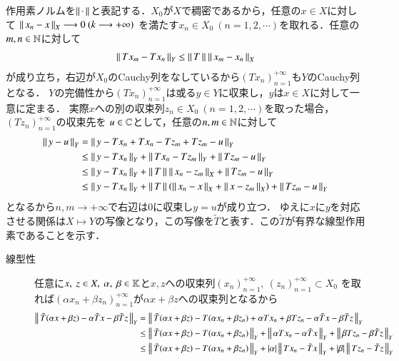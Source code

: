 \begin{prf}
		作用素ノルムを$\left\|\, \cdot\, \right\|_{}$と表記する．$X_0$が$X$で稠密であるから，任意の$x \in X$に対して
		$\left\|\, x_n - x\, \right\|_{X} \longrightarrow 0\ (k \longrightarrow +\infty)$
		を満たす$x_n \in X_0 \ (n=1,2,\cdots)$を取れる．任意の$m,n \in \mathbb{N}$に対して
		\begin{align}
			\left\|\, Tx_m - Tx_n\, \right\|_{Y} \leq \left\|\, T\, \right\|_{} \left\|\, x_m - x_n\, \right\|_{X}
		\end{align}
		が成り立ち，右辺が$X_0$のCauchy列をなしているから$(Tx_n)_{n=1}^{+\infty}$も$Y$のCauchy列となる．
		$Y$の完備性から$(Tx_n)_{n=1}^{+\infty}$は或る$y \in Y$に収束し，$y$は$x \in X$に対して一意に定まる．
		実際$x$への別の収束列$z_n \in X_0 \ (n=1,2,\cdots)$を取った場合，$(Tz_n)_{n=1}^{+\infty}$の収束先を
		$u \in \mathbb{C}$として，任意の$n,m \in \mathbb{N}$に対して
		\begin{align}
			\left\|\, y - u\, \right\|_{Y} &= \left\|\, y - Tx_n + Tx_n - Tz_m + Tz_m - u\, \right\|_{Y} \\
			&\leq \left\|\, y - Tx_n\, \right\|_{Y} + \left\|\, Tx_n - Tz_m\, \right\|_{Y} + \left\|\, Tz_m - u\, \right\|_{Y} \\
			&\leq \left\|\, y - Tx_n\, \right\|_{Y} + \left\|\, T\, \right\|_{}\left\|\, x_n - z_m\, \right\|_{X} + \left\|\, Tz_m - u\, \right\|_{Y} \\
			&\leq \left\|\, y - Tx_n\, \right\|_{Y} + \left\|\, T\, \right\|_{}\left(\left\|\, x_n - x\, \right\|_{X} + \left\|\, x - z_m\, \right\|_{X}\right)+ \left\|\, Tz_m - u\, \right\|_{Y}
		\end{align}
		となるから$n,m \longrightarrow +\infty$で右辺は0に収束し$y = u$が成り立つ．
		ゆえに$x$に$y$を対応させる関係は$X \longmapsto Y$の写像となり，この写像を$\tilde{T}$と表す．この$\tilde{T}$が有界な線型作用素であることを示す．
		\begin{description}
			\item[線型性]
				任意に$x,\ z \in X,\ \alpha,\ \beta \in \mathbb{K}$と$x,z$への収束列$(x_n)_{n=1}^{+\infty},\ (z_n)_{n=1}^{+\infty} \subset X_0$
				を取れば$(\alpha x_n + \beta z_n)_{n=1}^{+\infty}$が$\alpha x+ \beta z$への収束列となるから
				\begin{align}
					\Norm{\tilde{T}(\alpha x + \beta z) - \alpha \tilde{T}x - \beta \tilde{T}z}{Y}
					&= \Norm{\tilde{T}(\alpha x + \beta z) - T(\alpha x_n + \beta z_n) + \alpha Tx_n + \beta Tz_n - \alpha \tilde{T}x - \beta \tilde{T}z}{Y} \\
					&\leq \Norm{\tilde{T}(\alpha x + \beta z) - T(\alpha x_n + \beta z_n)}{Y}
						+ \Norm{\alpha Tx_n - \alpha \tilde{T}x}{Y} + \Norm{\beta Tz_n - \beta \tilde{T}z}{Y} \\
					&\leq \Norm{\tilde{T}(\alpha x + \beta z) - T(\alpha x_n + \beta z_n)}{Y}
						+ |\alpha| \Norm{Tx_n - \tilde{T}x}{Y} + |\beta| \Norm{Tz_n - \tilde{T}z}{Y} \\

\end{align}
\end{description}
\end{prf}
